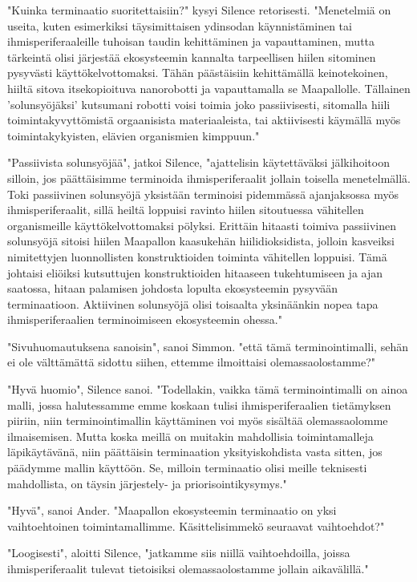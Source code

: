 "Kuinka terminaatio suoritettaisiin?" kysyi Silence retorisesti. "Menetelmiä on useita, kuten esimerkiksi täysimittaisen ydinsodan käynnistäminen tai ihmisperiferaaleille tuhoisan taudin kehittäminen ja vapauttaminen, mutta tärkeintä olisi järjestää ekosysteemin kannalta tarpeellisen hiilen sitominen pysyvästi käyttökelvottomaksi. Tähän päästäisiin kehittämällä keinotekoinen, hiiltä sitova itsekopioituva nanorobotti ja vapauttamalla se Maapallolle. Tällainen 'solunsyöjäksi' kutsumani robotti voisi toimia joko passiivisesti, sitomalla hiili toimintakyvyttömistä orgaanisista materiaaleista, tai aktiivisesti käymällä myös toimintakykyisten, elävien organismien kimppuun."


"Passiivista solunsyöjää", jatkoi Silence, "ajattelisin käytettäväksi jälkihoitoon silloin, jos päättäisimme terminoida ihmisperiferaalit jollain toisella menetelmällä. Toki passiivinen solunsyöjä yksistään terminoisi pidemmässä ajanjaksossa myös ihmisperiferaalit, sillä heiltä loppuisi ravinto hiilen sitoutuessa vähitellen organismeille käyttökelvottomaksi pölyksi. Erittäin hitaasti toimiva passiivinen solunsyöjä sitoisi hiilen Maapallon kaasukehän hiilidioksidista, jolloin kasveiksi nimitettyjen luonnollisten konstruktioiden toiminta vähitellen loppuisi. Tämä johtaisi eliöiksi kutsuttujen konstruktioiden hitaaseen tukehtumiseen ja ajan saatossa, hitaan palamisen johdosta lopulta ekosysteemin pysyvään terminaatioon. Aktiivinen solunsyöjä olisi toisaalta yksinäänkin nopea tapa ihmisperiferaalien terminoimiseen ekosysteemin ohessa."


"Sivuhuomautuksena sanoisin", sanoi Simmon. "että tämä terminointimalli, sehän ei ole välttämättä sidottu siihen, ettemme ilmoittaisi olemassaolostamme?"


"Hyvä huomio", Silence sanoi. "Todellakin, vaikka tämä terminointimalli on ainoa malli, jossa halutessamme emme koskaan tulisi ihmisperiferaalien tietämyksen piiriin, niin terminointimallin käyttäminen voi myös sisältää olemassaolomme ilmaisemisen. Mutta koska meillä on muitakin mahdollisia toimintamalleja läpikäytävänä, niin päättäisin terminaation yksityiskohdista vasta sitten, jos päädymme mallin käyttöön. Se, milloin terminaatio olisi meille teknisesti mahdollista, on täysin järjestely- ja priorisointikysymys."


"Hyvä", sanoi Ander. "Maapallon ekosysteemin terminaatio on yksi vaihtoehtoinen toimintamallimme. Käsittelisimmekö seuraavat vaihtoehdot?"




\psep "Loogisesti", aloitti Silence, "jatkamme siis niillä vaihtoehdoilla, joissa ihmisperiferaalit tulevat tietoisiksi olemassaolostamme jollain aikavälillä."


